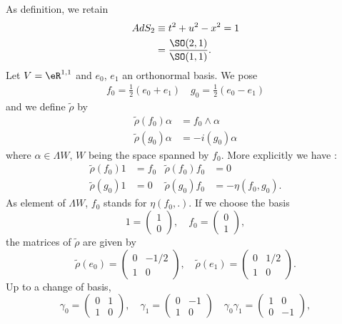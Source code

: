 As definition, we retain
\begin{equation}
\begin{split}
  AdS_2&\equiv t^2+u^2-x^2=1\\
    &=\frac{ \SO(2,1) }{ \SO(1,1) }.
\end{split}
\end{equation}
Let $V=\eR^{1,1}$ and $e_0$, $e_1$ an orthonormal basis. We pose 
\begin{align*}
  f_0=\frac{ 1 }{2}(e_0+e_1)\quad g_0=\frac{ 1 }{2}(e_0-e_1)
\end{align*}
and we define $\tilde\rho$ by
\begin{subequations}
\begin{align}
  \tilde\rho(f_0)\alpha&=f_0\wedge\alpha\\
    \tilde\rho(g_0)\alpha&=-i(g_0)\alpha
\end{align}
\end{subequations}
where $\alpha\in\Lambda W$, $W$ being the space spanned by $f_0$. More explicitly we have :
\begin{subequations}
\begin{align}
  \tilde\rho (f_0)1&=f_0&\tilde\rho (f_0)f_0&=0\\
\tilde\rho (g_0)1&=0&\tilde\rho (g_0)f_0&=-\eta(f_0,g_0).
\end{align}
\end{subequations}
As element of $\Lambda W$, $f_0$ stands for $\eta(f_0,.)$. If we choose the basis
\[ 
  1=
\begin{pmatrix}
1\\0
\end{pmatrix},
\quad
f_0=
\begin{pmatrix}
0\\1
\end{pmatrix},
\]
 the matrices of $\tilde\rho$ are given by
\[ 
  \tilde\rho(e_0)=
\begin{pmatrix}
0&-1/2\\
1&0
\end{pmatrix},
\quad
\tilde\rho(e_1)=
\begin{pmatrix}
0&1/2\\
1&0
\end{pmatrix}.
\]
Up to a change of basis,
\[ 
  \gamma_0=
\begin{pmatrix}
0&1\\1&0
\end{pmatrix},
\quad
\gamma_1=
\begin{pmatrix}
0&-1\\1&0
\end{pmatrix}
\quad
\gamma_0\gamma_1=
\begin{pmatrix}
1&0\\0&-1
\end{pmatrix},
\]
